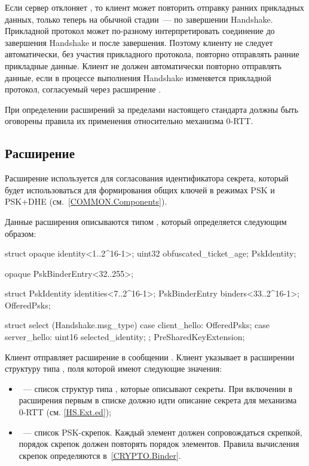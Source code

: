 Если сервер отклоняет , то клиент может повторить отправку 
ранних прикладных данных, только теперь на обычной стадии~--- по завершении 
Handshake.
%
Прикладной протокол может по-разному интерпретировать соединение
до завершения Handshake и после завершения. Поэтому клиенту не следует 
автоматически, без участия прикладного протокола, повторно отправлять ранние 
прикладные данные.
%
Клиент не должен автоматически повторно отправлять данные, если в процессе 
выполнения Handshake изменяется прикладной протокол, согласуемый
через расширение .

При определении расширений за пределами настоящего стандарта должны быть 
оговорены правила их применения относительно механизма 0-RTT.

\subsection{Расширение }\label{HS.Ext.psk} 

Расширение  используется для согласования 
идентификатора секрета, который будет использоваться для формирования общих 
ключей в режимах PSK и PSK+DHE (см.~\ref{COMMON.Components}).

Данные расширения  описываются типом 
, который определяется следующим образом:

\begin{codeblock}
struct {
  opaque identity<1..2^16-1>;
  uint32 obfuscated_ticket_age;
} PskIdentity;

opaque PskBinderEntry<32..255>;

struct {
  PskIdentity identities<7..2^16-1>;
  PskBinderEntry binders<33..2^16-1>;
} OfferedPsks;

struct {
  select (Handshake.msg_type) {
    case client_hello: OfferedPsks;
    case server_hello: 
      uint16 selected_identity;
  };
} PreSharedKeyExtension;
\end{codeblock}

Клиент отправляет расширение  в сообщении 
. Клиент указывает в расширении структуру типа 
, поля которой имеют следующие значения:

\begin{itemize}
\item
{}~--- список структур типа , которые 
описывают секреты. При включении в  расширения 
 первым в списке должно идти описание секрета для 
механизма 0-RTT (см. \ref{HS.Ext.ed});

\item
{}~--- список PSK-скрепок. Каждый элемент  должен 
сопровождаться скрепкой, порядок скрепок должен повторять порядок элементов.
Правила вычисления скрепок определяются в~\ref{CRYPTO.Binder}.
\end{itemize}

